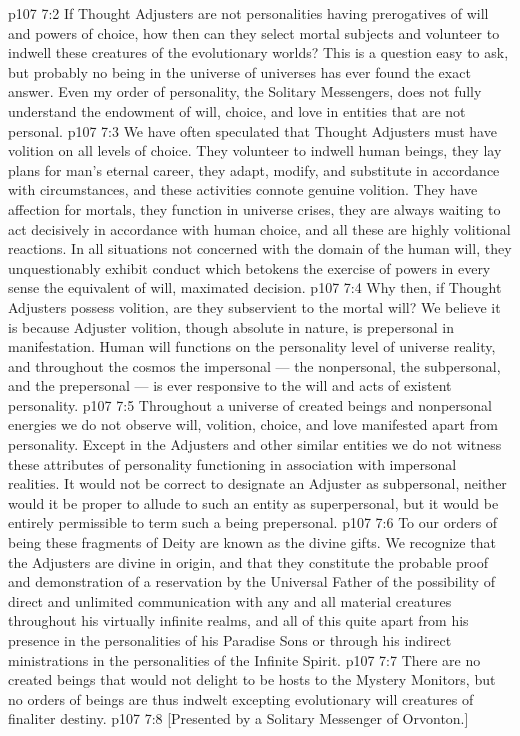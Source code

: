 \vs p107 7:2 If Thought Adjusters are not personalities having prerogatives of will and powers of choice, how then can they select mortal subjects and volunteer to indwell these creatures of the evolutionary worlds? This is a question easy to ask, but probably no being in the universe of universes has ever found the exact answer. Even my order of personality, the Solitary Messengers, does not fully understand the endowment of will, choice, and love in entities that are not personal.
\vs p107 7:3 We have often speculated that Thought Adjusters must have volition on all  levels of choice. They volunteer to indwell human beings, they lay plans for man’s eternal career, they adapt, modify, and substitute in accordance with circumstances, and these activities connote genuine volition. They have affection for mortals, they function in universe crises, they are always waiting to act decisively in accordance with human choice, and all these are highly volitional reactions. In all situations not concerned with the domain of the human will, they unquestionably exhibit conduct which betokens the exercise of powers in every sense the equivalent of will, maximated decision.
\vs p107 7:4 Why then, if Thought Adjusters possess volition, are they subservient to the mortal will? We believe it is because Adjuster volition, though absolute in nature, is prepersonal in manifestation. Human will functions on the personality level of universe reality, and throughout the cosmos the impersonal --- the nonpersonal, the subpersonal, and the prepersonal --- is ever responsive to the will and acts of existent personality.
\vs p107 7:5 Throughout a universe of created beings and nonpersonal energies we do not observe will, volition, choice, and love manifested apart from personality. Except in the Adjusters and other similar entities we do not witness these attributes of personality functioning in association with impersonal realities. It would not be correct to designate an Adjuster as subpersonal, neither would it be proper to allude to such an entity as superpersonal, but it would be entirely permissible to term such a being prepersonal.
\vs p107 7:6 \pc To our orders of being these fragments of Deity are known as the divine gifts. We recognize that the Adjusters are divine in origin, and that they constitute the probable proof and demonstration of a reservation by the Universal Father of the possibility of direct and unlimited communication with any and all material creatures throughout his virtually infinite realms, and all of this quite apart from his presence in the personalities of his Paradise Sons or through his indirect ministrations in the personalities of the Infinite Spirit.
\vs p107 7:7 There are no created beings that would not delight to be hosts to the Mystery Monitors, but no orders of beings are thus indwelt excepting evolutionary will creatures of finaliter destiny.
\vsetoff
\vs p107 7:8 [Presented by a Solitary Messenger of Orvonton.]
\quizlink
